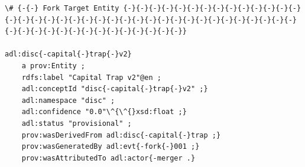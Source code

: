 \begin{lstlisting}
\# {-{-} Fork Target Entity {-}{-}{-}{-}{-}{-}{-}{-}{-}{-}{-}{-}{-}{-}{-}{-}{-}{-}{-}{-}{-}{-}{-}{-}{-}{-}{-}{-}{-}{-}{-}{-}{-}{-}{-}{-}{-}{-}{-}{-}{-}{-}{-}{-}{-}{-}{-}{-}{-}{-}{-}}

adl:disc{-capital{-}trap{-}v2}
    a prov:Entity ;
    rdfs:label "Capital Trap v2"@en ;
    adl:conceptId "disc{-capital{-}trap{-}v2" ;}
    adl:namespace "disc" ;
    adl:confidence "0.0"\^{\^{}xsd:float ;}
    adl:status "provisional" ;
    prov:wasDerivedFrom adl:disc{-capital{-}trap ;}
    prov:wasGeneratedBy adl:evt{-fork{-}001 ;}
    prov:wasAttributedTo adl:actor{-merger .}
\end{lstlisting}
